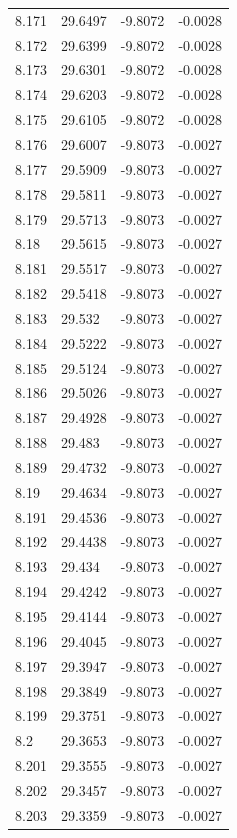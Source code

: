 \begin{tabular}{llll}
8.171 & 29.6497 & -9.8072 & -0.0028 \\
8.172 & 29.6399 & -9.8072 & -0.0028 \\
8.173 & 29.6301 & -9.8072 & -0.0028 \\
8.174 & 29.6203 & -9.8072 & -0.0028 \\
8.175 & 29.6105 & -9.8072 & -0.0028 \\
8.176 & 29.6007 & -9.8073 & -0.0027 \\
8.177 & 29.5909 & -9.8073 & -0.0027 \\
8.178 & 29.5811 & -9.8073 & -0.0027 \\
8.179 & 29.5713 & -9.8073 & -0.0027 \\
8.18 & 29.5615 & -9.8073 & -0.0027 \\
8.181 & 29.5517 & -9.8073 & -0.0027 \\
8.182 & 29.5418 & -9.8073 & -0.0027 \\
8.183 & 29.532 & -9.8073 & -0.0027 \\
8.184 & 29.5222 & -9.8073 & -0.0027 \\
8.185 & 29.5124 & -9.8073 & -0.0027 \\
8.186 & 29.5026 & -9.8073 & -0.0027 \\
8.187 & 29.4928 & -9.8073 & -0.0027 \\
8.188 & 29.483 & -9.8073 & -0.0027 \\
8.189 & 29.4732 & -9.8073 & -0.0027 \\
8.19 & 29.4634 & -9.8073 & -0.0027 \\
8.191 & 29.4536 & -9.8073 & -0.0027 \\
8.192 & 29.4438 & -9.8073 & -0.0027 \\
8.193 & 29.434 & -9.8073 & -0.0027 \\
8.194 & 29.4242 & -9.8073 & -0.0027 \\
8.195 & 29.4144 & -9.8073 & -0.0027 \\
8.196 & 29.4045 & -9.8073 & -0.0027 \\
8.197 & 29.3947 & -9.8073 & -0.0027 \\
8.198 & 29.3849 & -9.8073 & -0.0027 \\
8.199 & 29.3751 & -9.8073 & -0.0027 \\
8.2 & 29.3653 & -9.8073 & -0.0027 \\
8.201 & 29.3555 & -9.8073 & -0.0027 \\
8.202 & 29.3457 & -9.8073 & -0.0027 \\
8.203 & 29.3359 & -9.8073 & -0.0027 \\

\end{tabular}
